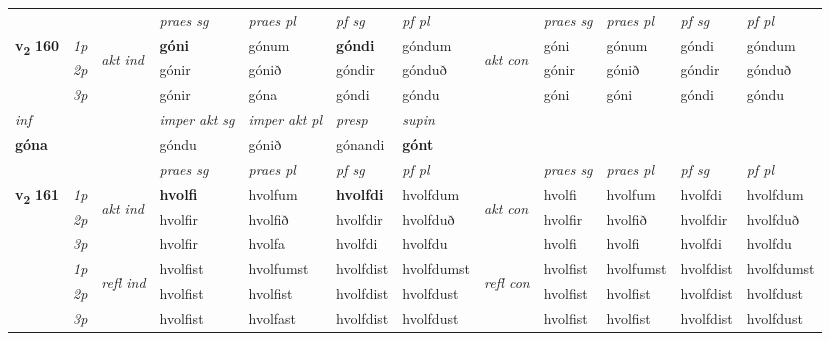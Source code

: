 \begin{longtable}[l]{X>{\footnotesize\itshape}llXXXXlXXXX}
 & &   & \textit{praes sg}  & \textit{praes pl}    & \textit{ pf sg} & \textit{pf pl} & & \textit{praes sg}  & \textit{praes pl}    & \textit{pf sg} & \textit{pf pl }  \\ \cmidrule{4-7} \cmidrule{9-12}
 \multirow{2}{*}{{{\textbf{v{\textsubscript{2}}} \Large{\textbf{160}}}}}  & 1p & \multirow{3}{*}{\begin{turn}{90}\textit{akt ind}\end{turn}} & \textbf{góni} & gónum & \textbf{góndi} & góndum & \multirow{3}{*}{\begin{turn}{90}\textit{akt con}\end{turn}} &góni & gónum & góndi & góndum\\*
 & 2p &  &  gónir  & gónið & góndir & gónduð & & gónir & gónið & góndir & gónduð \\*
 & 3p &  & gónir & góna & góndi & góndu & & góni & góni& góndi & góndu \\*
\cmidrule{4-7} \cmidrule{9-12}

   {\textit{inf}} & &  & \textit{imper akt sg} & \textit{imper akt pl}   & \textit{presp} & \textit{supin}   \\*
  {\textbf{góna}} & && góndu  & gónið   & gónandi &  \textbf{gónt}   \\*

\midrule

 & &   & \textit{praes sg}  & \textit{praes pl}    & \textit{ pf sg} & \textit{pf pl} & & \textit{praes sg}  & \textit{praes pl}    & \textit{pf sg} & \textit{pf pl }  \\ \cmidrule{4-7} \cmidrule{9-12}
 \multirow{2}{*}{{{\textbf{v{\textsubscript{2}}} \Large{\textbf{161}}}}}  & 1p & \multirow{3}{*}{\begin{turn}{90}\textit{akt ind}\end{turn}} & \textbf{hvolfi} & hvolfum & \textbf{hvolfdi} & hvolfdum & \multirow{3}{*}{\begin{turn}{90}\textit{akt con}\end{turn}} &hvolfi & hvolfum & hvolfdi & hvolfdum\\*
 & 2p &  &  hvolfir  & hvolfið & hvolfdir & hvolfduð & & hvolfir & hvolfið & hvolfdir & hvolfduð \\*
 & 3p &  & hvolfir & hvolfa & hvolfdi & hvolfdu & & hvolfi & hvolfi& hvolfdi & hvolfdu \\*
\cmidrule{4-7} \cmidrule{9-12}
 & 1p & \multirow{3}{*}{\begin{turn}{90}\textit{refl ind}\end{turn}}  & hvolfist & hvolfumst & hvolfdist & hvolfdumst & \multirow{3}{*}{\begin{turn}{90}\textit{refl con}\end{turn}}  &hvolfist & hvolfumst & hvolfdist & hvolfdumst \\*
 & 2p &  & hvolfist & hvolfist & hvolfdist & hvolfdust & &hvolfist & hvolfist & hvolfdist & hvolfdust \\*
 & 3p  & & hvolfist & hvolfast & hvolfdist & hvolfdust & & hvolfist & hvolfist& hvolfdist & hvolfdust \\*
\cmidrule{4-7} \cmidrule{9-12}


\end{longtable}
